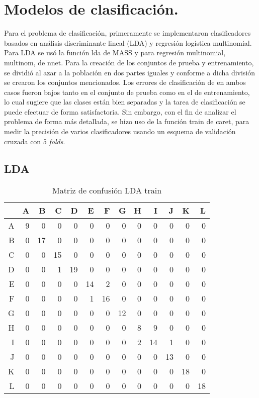 \pagebreak
\restoregeometry 
\section{Modelos de clasificación.}

Para el problema de clasificación, primeramente se implementaron clasificadores basados en análisis discriminante lineal (LDA) y regresión logística multinomial. Para LDA se usó la función \textsf{lda} de MASS y para regresión multinomial, \textsf{multinom}, de nnet. Para la creación de los conjuntos de prueba y entrenamiento, se dividió al azar a la población en dos partes iguales y conforme a dicha división se crearon los conjuntos mencionados. Los errores de clasificación de en ambos casos fueron bajos tanto en el conjunto de prueba como en el de entrenamiento, lo cual sugiere que las clases están bien separadas y la tarea de clasificación se puede efectuar de forma satisfactoria. Sin embargo, con el fin de analizar el problema de forma más detallada, se hizo uso de la función \textsf{train} de caret, para medir la precisión de varios clasificadores usando un esquema de validación cruzada con 5 \textit{folds}.

\subsection{LDA}

\begin{table}[ht]
\centering
\begin{tabular}{rrrrrrrrrrrrr}
  \hline
 & A & B & C & D & E & F & G & H & I & J & K & L \\ 
  \hline
A &   9 &   0 &   0 &   0 &   0 &   0 &   0 &   0 &   0 &   0 &   0 &   0 \\ 
  B &   0 &  17 &   0 &   0 &   0 &   0 &   0 &   0 &   0 &   0 &   0 &   0 \\ 
  C &   0 &   0 &  15 &   0 &   0 &   0 &   0 &   0 &   0 &   0 &   0 &   0 \\ 
  D &   0 &   0 &   1 &  19 &   0 &   0 &   0 &   0 &   0 &   0 &   0 &   0 \\ 
  E &   0 &   0 &   0 &   0 &  14 &   2 &   0 &   0 &   0 &   0 &   0 &   0 \\ 
  F &   0 &   0 &   0 &   0 &   1 &  16 &   0 &   0 &   0 &   0 &   0 &   0 \\ 
  G &   0 &   0 &   0 &   0 &   0 &   0 &  12 &   0 &   0 &   0 &   0 &   0 \\ 
  H &   0 &   0 &   0 &   0 &   0 &   0 &   0 &   8 &   9 &   0 &   0 &   0 \\ 
  I &   0 &   0 &   0 &   0 &   0 &   0 &   0 &   2 &  14 &   1 &   0 &   0 \\ 
  J &   0 &   0 &   0 &   0 &   0 &   0 &   0 &   0 &   0 &  13 &   0 &   0 \\ 
  K &   0 &   0 &   0 &   0 &   0 &   0 &   0 &   0 &   0 &   0 &  18 &   0 \\ 
  L &   0 &   0 &   0 &   0 &   0 &   0 &   0 &   0 &   0 &   0 &   0 &  18 \\ 
   \hline
\end{tabular}
	\label{tabla:confusionLDAtrain}
	\caption{Matriz de confusión LDA train}
\end{table}

